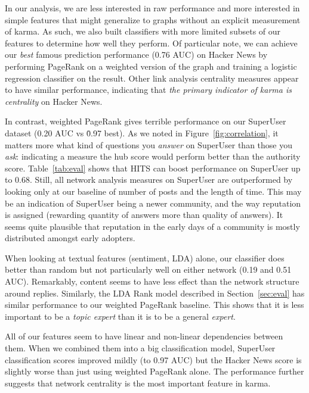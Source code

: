 \documentclass[11pt]{article}
\begin{document}
In our analysis, we are less interested in raw performance and more interested in 
simple features that might generalize
to graphs without an explicit measurement of karma. As such, we also built classifiers
with more limited subsets of our features to determine how well they perform. Of particular note,
we can achieve our \textit{best} famous prediction performance (0.76 AUC) 
on Hacker News by performing PageRank on a weighted version of the graph and training
a logistic regression classifier on the result. Other link analysis centrality measures 
appear to have similar performance, indicating that \textit{the primary indicator of karma 
is centrality} on Hacker News.

In contrast, weighted PageRank gives terrible performance on our SuperUser dataset
(0.20 AUC vs \. 0.97 best). As we noted in Figure~\ref{fig:correlation}, it matters
more what kind of questions you \textit{answer} on SuperUser than those you 
\textit{ask}: indicating a measure the hub score would perform better than
the authority score. Table~\ref{tab:eval} shows that HITS can boost performance
on SuperUser up to 0.68. Still, all network analysis measures on SuperUser 
are outperformed by looking only at our baseline of number of posts and the length
of time. This may be an indication of SuperUser being a newer community, and the
way reputation is assigned (rewarding quantity of answers more than quality of answers).
It seems quite plausible that reputation in the early days of a community is mostly
distributed amongst early adopters.

When looking at textual features (sentiment, LDA) alone, our classifier does better than random 
but not particularly well on either network (0.19 and 0.51 AUC). Remarkably, content
seems to have less effect than the network structure around replies. Similarly, the LDA Rank model 
described in Section~\ref{sec:eval} has similar performance to our weighted PageRank baseline. 
This shows that it is less important to be a \textit{topic expert} than it is to be a general
\textit{expert}.

All of our features seem to have linear and non-linear dependencies between them. When we combined
them into a big classification model, SuperUser classification scores improved mildly (to 0.97 AUC)
but the Hacker News score is slightly worse than just using weighted PageRank alone. The performance
further suggests that network centrality is the most important feature in karma.
\end{document}
